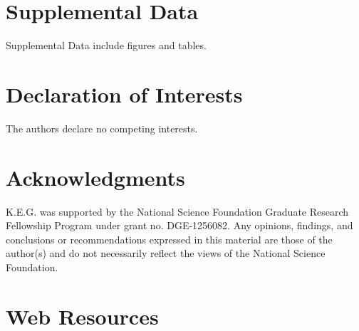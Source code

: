\documentclass[12pt]{article}
\newcommand{\add}[1]{{\color{red}{[... #1 ...]}}}
\begin{document}
\newpage
\section*{Supplemental Data}


Supplemental Data include \add{??} figures and \add{??} tables.



\section*{Declaration of Interests}


The authors declare no competing interests.


\section*{Acknowledgments}


K.E.G. was supported by the National Science Foundation Graduate Research Fellowship Program under grant no. DGE-1256082. Any opinions, findings, and conclusions or recommendations expressed in this material are those of the author(s) and do not necessarily reflect the views of the National Science Foundation.



\section*{Web Resources}
\end{document}
